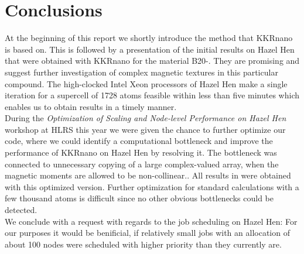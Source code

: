\documentclass [a4paper, 12pt]{article}
\begin{document}
\section{Conclusions}
At the beginning of this report we shortly introduce the method that KKRnano is based on. 
This is followed by a presentation of the initial results on Hazel Hen that were obtained 
with KKRnano for the material B20-. 
They are promising and suggest further investigation
of complex magnetic textures in this particular compound.
The high-clocked Intel Xeon processors of Hazel Hen
make a single iteration for a supercell of 1728 atoms feasible within 
less than five minutes which enables us
to obtain results in a timely manner.\\

During the
\textit{Optimization of Scaling and Node-level Performance on Hazel Hen} workshop at HLRS this year we were
given the chance to further optimize our code, where we could identify a computational bottleneck and
improve the performance of KKRnano on Hazel Hen by resolving it. The bottleneck was
connected to unnecessary copying of a large complex-valued array, when the magnetic moments are allowed to be
non-collinear..
All results in  were
obtained with this optimized version.
Further optimization for standard calculations with a few thousand atoms 
is difficult since no other obvious bottlenecks could be detected.
\\
We conclude with a request with regards to the job scheduling on Hazel Hen:
For our purposes it would be benificial, if relatively small jobs with an allocation of
about 100 nodes 
were scheduled with higher priority than they currently are.
\end{document}
